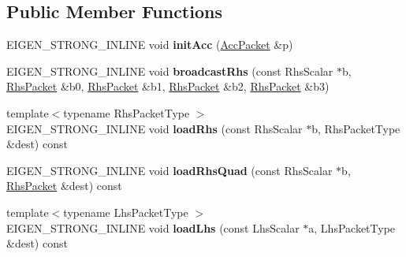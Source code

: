 \subsection*{Public Member Functions}
\begin{DoxyCompactItemize}
\item 
\mbox{\label{class_eigen_1_1internal_1_1gebp__traits_aa578620545719a8a4a1390c28852ae7b}} 
E\+I\+G\+E\+N\+\_\+\+S\+T\+R\+O\+N\+G\+\_\+\+I\+N\+L\+I\+NE void {\bfseries init\+Acc} (\hyperlink{class_eigen_1_1internal_1_1_tensor_lazy_evaluator_writable}{Acc\+Packet} \&p)
\item 
\mbox{\label{class_eigen_1_1internal_1_1gebp__traits_aa6e3a3234f62ac8d69785a361efb86f9}} 
E\+I\+G\+E\+N\+\_\+\+S\+T\+R\+O\+N\+G\+\_\+\+I\+N\+L\+I\+NE void {\bfseries broadcast\+Rhs} (const Rhs\+Scalar $\ast$b, \hyperlink{class_eigen_1_1internal_1_1_tensor_lazy_evaluator_writable}{Rhs\+Packet} \&b0, \hyperlink{class_eigen_1_1internal_1_1_tensor_lazy_evaluator_writable}{Rhs\+Packet} \&b1, \hyperlink{class_eigen_1_1internal_1_1_tensor_lazy_evaluator_writable}{Rhs\+Packet} \&b2, \hyperlink{class_eigen_1_1internal_1_1_tensor_lazy_evaluator_writable}{Rhs\+Packet} \&b3)
\item 
\mbox{\label{class_eigen_1_1internal_1_1gebp__traits_aa9ae85d85eae99a248dae6b2350999db}} 
{\footnotesize template$<$typename Rhs\+Packet\+Type $>$ }\\E\+I\+G\+E\+N\+\_\+\+S\+T\+R\+O\+N\+G\+\_\+\+I\+N\+L\+I\+NE void {\bfseries load\+Rhs} (const Rhs\+Scalar $\ast$b, Rhs\+Packet\+Type \&dest) const
\item 
\mbox{\label{class_eigen_1_1internal_1_1gebp__traits_a24faddc403d5ca4609bc0c3ccef20549}} 
E\+I\+G\+E\+N\+\_\+\+S\+T\+R\+O\+N\+G\+\_\+\+I\+N\+L\+I\+NE void {\bfseries load\+Rhs\+Quad} (const Rhs\+Scalar $\ast$b, \hyperlink{class_eigen_1_1internal_1_1_tensor_lazy_evaluator_writable}{Rhs\+Packet} \&dest) const
\item 
\mbox{\label{class_eigen_1_1internal_1_1gebp__traits_a4eb22d4856136599f64daf69b42b30d7}} 
{\footnotesize template$<$typename Lhs\+Packet\+Type $>$ }\\E\+I\+G\+E\+N\+\_\+\+S\+T\+R\+O\+N\+G\+\_\+\+I\+N\+L\+I\+NE void {\bfseries load\+Lhs} (const Lhs\+Scalar $\ast$a, Lhs\+Packet\+Type \&dest) const

\end{DoxyCompactItemize}
